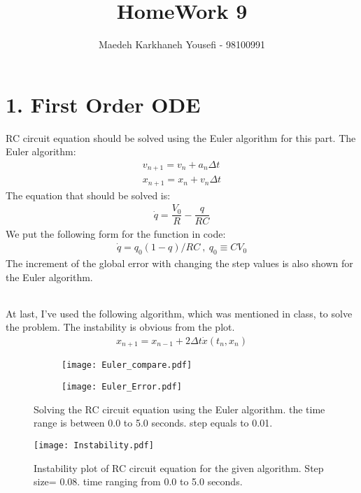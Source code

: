 \documentclass[12pt]{article}
\title{HomeWork 9}
\author{Maedeh Karkhaneh Yousefi - 98100991}
\begin{document}
\maketitle
\part*{1. First Order ODE}
RC circuit equation should be solved using the Euler algorithm for this part. 
The Euler algorithm: 
\begin{gather*}
v_{n+1} = v_{n} + a_{n} \Delta t \\
x_{n+1} = x_{n} + v_{n} \Delta t
\end{gather*}
The equation that should be solved is: 
\begin{gather*}
\dot{q}= \dfrac{V_{0}}{R} - \dfrac{q}{RC}
\end{gather*}
We put the following form for the function in code:
\begin{gather*}
\dot{q} = q_{0}(1-q)/ RC\ ,\ q_{0}\equiv CV_{0}
\end{gather*}
The increment of the global error with changing the step values is also shown for the Euler algorithm.
\paragraph*{} At last, I've used the following algorithm, which was mentioned in class, to solve the problem. The instability is obvious from the plot. 
\begin{gather*}
x_{n+1} = x_{n-1} + 2\Delta t \dot{x} (t_{n}, x_{n})
\end{gather*}
\begin{figure}[H]
	\centering
	\begin{subfigure}[t]{0.8\textwidth}
		\texttt{[image: Euler\_compare.pdf]}
		\label{fig:mesh1.1}
		\caption{}
	\end{subfigure}\par\bigskip 
	\begin{subfigure}[t]{0.8\textwidth}
		\texttt{[image: Euler\_Error.pdf]}
		\label{fig:mesh1.2}
		\caption{}
	\end{subfigure}
	\label{fig:mesh1}
	\caption{Solving the RC circuit equation using the Euler algorithm. the time range is between 0.0 to 5.0 seconds. step equals to 0.01.}
\end{figure}
\begin{figure}[H]
	\centering
	\texttt{[image: Instability.pdf]}
	\label{fig:mesh2}
	\caption{Instability plot of RC circuit equation for the given algorithm. Step size= 0.08. time ranging from 0.0 to 5.0 seconds. }
\end{figure}
\end{document}
